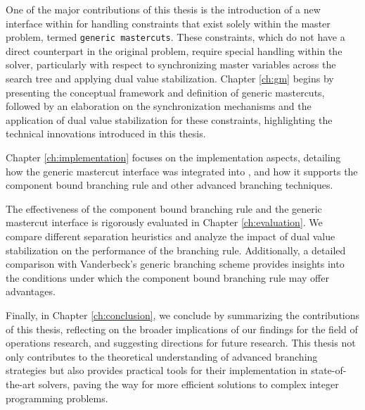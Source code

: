 One of the major contributions of this thesis is the introduction of a new interface within \GCG{} for handling constraints that exist solely within the master problem, termed \texttt{generic mastercuts}. These constraints, which do not have a direct counterpart in the original problem, require special handling within the solver, particularly with respect to synchronizing master variables across the search tree and applying dual value stabilization. Chapter \ref{ch:gm} begins by presenting the conceptual framework and definition of generic mastercuts, followed by an elaboration on the synchronization mechanisms and the application of dual value stabilization for these constraints, highlighting the technical innovations introduced in this thesis.

Chapter \ref{ch:implementation} focuses on the implementation aspects, detailing how the generic mastercut interface was integrated into \GCG{}, and how it supports the component bound branching rule and other advanced branching techniques.

The effectiveness of the component bound branching rule and the generic mastercut interface is rigorously evaluated in Chapter \ref{ch:evaluation}. We compare different separation heuristics and analyze the impact of dual value stabilization on the performance of the branching rule. Additionally, a detailed comparison with Vanderbeck's generic branching scheme provides insights into the conditions under which the component bound branching rule may offer advantages.

Finally, in Chapter \ref{ch:conclusion}, we conclude by summarizing the contributions of this thesis, reflecting on the broader implications of our findings for the field of operations research, and suggesting directions for future research. This thesis not only contributes to the theoretical understanding of advanced branching strategies but also provides practical tools for their implementation in state-of-the-art solvers, paving the way for more efficient solutions to complex integer programming problems.
